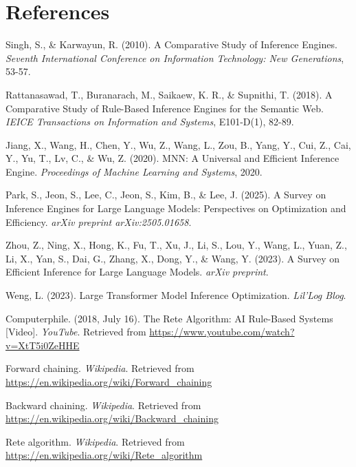 \documentclass[12pt,a4paper]{article}
\begin{document}
\section{References}
\begin{thebibliography}{99}
\vspace{-1.0cm}
Singh, S., \& Karwayun, R. (2010). A Comparative Study of Inference Engines. \textit{Seventh International Conference on Information Technology: New Generations}, 53-57.

Rattanasawad, T., Buranarach, M., Saikaew, K. R., \& Supnithi, T. (2018). A Comparative Study of Rule-Based Inference Engines for the Semantic Web. \textit{IEICE Transactions on Information and Systems}, E101-D(1), 82-89.

Jiang, X., Wang, H., Chen, Y., Wu, Z., Wang, L., Zou, B., Yang, Y., Cui, Z., Cai, Y., Yu, T., Lv, C., \& Wu, Z. (2020). MNN: A Universal and Efficient Inference Engine. \textit{Proceedings of Machine Learning and Systems}, 2020.

Park, S., Jeon, S., Lee, C., Jeon, S., Kim, B., \& Lee, J. (2025). A Survey on Inference Engines for Large Language Models: Perspectives on Optimization and Efficiency. \textit{arXiv preprint arXiv:2505.01658}.

Zhou, Z., Ning, X., Hong, K., Fu, T., Xu, J., Li, S., Lou, Y., Wang, L., Yuan, Z., Li, X., Yan, S., Dai, G., Zhang, X., Dong, Y., \& Wang, Y. (2023). A Survey on Efficient Inference for Large Language Models. \textit{arXiv preprint}.

Weng, L. (2023). Large Transformer Model Inference Optimization. \textit{Lil'Log Blog}.

Computerphile. (2018, July 16). The Rete Algorithm: AI Rule-Based Systems [Video]. \textit{YouTube}. Retrieved from \url{https://www.youtube.com/watch?v=XtT5i0ZeHHE}

Forward chaining. \textit{Wikipedia}. Retrieved from \url{https://en.wikipedia.org/wiki/Forward_chaining}

Backward chaining. \textit{Wikipedia}. Retrieved from \url{https://en.wikipedia.org/wiki/Backward_chaining}

Rete algorithm. \textit{Wikipedia}. Retrieved from \url{https://en.wikipedia.org/wiki/Rete_algorithm}


\end{thebibliography}
\end{document}
